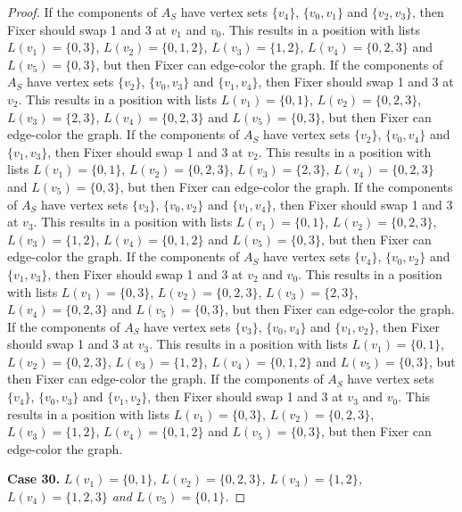 \documentclass[12pt]{amsart}
\theoremstyle{plain}
\theoremstyle{definition}
\theoremstyle{remark}
\begin{document}
\begin{proof}
If the components of $A_S$ have vertex sets $\{v_4\}$, $\{v_0, v_1\}$ and $\{v_2, v_3\}$, then Fixer should swap 1 and 3 at $v_1$ and $v_0$. This results in a position with lists $L(v_1) = \{0, 3\}$, $L(v_2) = \{0, 1, 2\}$, $L(v_3) = \{1, 2\}$, $L(v_4) = \{0, 2, 3\}$ and $L(v_5) = \{0, 3\}$, but then Fixer can edge-color the graph.
If the components of $A_S$ have vertex sets $\{v_2\}$, $\{v_0, v_3\}$ and $\{v_1, v_4\}$, then Fixer should swap 1 and 3 at $v_2$. This results in a position with lists $L(v_1) = \{0, 1\}$, $L(v_2) = \{0, 2, 3\}$, $L(v_3) = \{2, 3\}$, $L(v_4) = \{0, 2, 3\}$ and $L(v_5) = \{0, 3\}$, but then Fixer can edge-color the graph.
If the components of $A_S$ have vertex sets $\{v_2\}$, $\{v_0, v_4\}$ and $\{v_1, v_3\}$, then Fixer should swap 1 and 3 at $v_2$. This results in a position with lists $L(v_1) = \{0, 1\}$, $L(v_2) = \{0, 2, 3\}$, $L(v_3) = \{2, 3\}$, $L(v_4) = \{0, 2, 3\}$ and $L(v_5) = \{0, 3\}$, but then Fixer can edge-color the graph.
If the components of $A_S$ have vertex sets $\{v_3\}$, $\{v_0, v_2\}$ and $\{v_1, v_4\}$, then Fixer should swap 1 and 3 at $v_3$. This results in a position with lists $L(v_1) = \{0, 1\}$, $L(v_2) = \{0, 2, 3\}$, $L(v_3) = \{1, 2\}$, $L(v_4) = \{0, 1, 2\}$ and $L(v_5) = \{0, 3\}$, but then Fixer can edge-color the graph.
If the components of $A_S$ have vertex sets $\{v_4\}$, $\{v_0, v_2\}$ and $\{v_1, v_3\}$, then Fixer should swap 1 and 3 at $v_2$ and $v_0$. This results in a position with lists $L(v_1) = \{0, 3\}$, $L(v_2) = \{0, 2, 3\}$, $L(v_3) = \{2, 3\}$, $L(v_4) = \{0, 2, 3\}$ and $L(v_5) = \{0, 3\}$, but then Fixer can edge-color the graph.
If the components of $A_S$ have vertex sets $\{v_3\}$, $\{v_0, v_4\}$ and $\{v_1, v_2\}$, then Fixer should swap 1 and 3 at $v_3$. This results in a position with lists $L(v_1) = \{0, 1\}$, $L(v_2) = \{0, 2, 3\}$, $L(v_3) = \{1, 2\}$, $L(v_4) = \{0, 1, 2\}$ and $L(v_5) = \{0, 3\}$, but then Fixer can edge-color the graph.
If the components of $A_S$ have vertex sets $\{v_4\}$, $\{v_0, v_3\}$ and $\{v_1, v_2\}$, then Fixer should swap 1 and 3 at $v_3$ and $v_0$. This results in a position with lists $L(v_1) = \{0, 3\}$, $L(v_2) = \{0, 2, 3\}$, $L(v_3) = \{1, 2\}$, $L(v_4) = \{0, 1, 2\}$ and $L(v_5) = \{0, 3\}$, but then Fixer can edge-color the graph.

\noindent\textbf{Case 30.  }\textit{$L(v_1) = \{0, 1\}$, $L(v_2) = \{0, 2, 3\}$, $L(v_3) = \{1, 2\}$, $L(v_4) = \{1, 2, 3\}$ and $L(v_5) = \{0, 1\}$.}


\end{proof}
\end{document}
